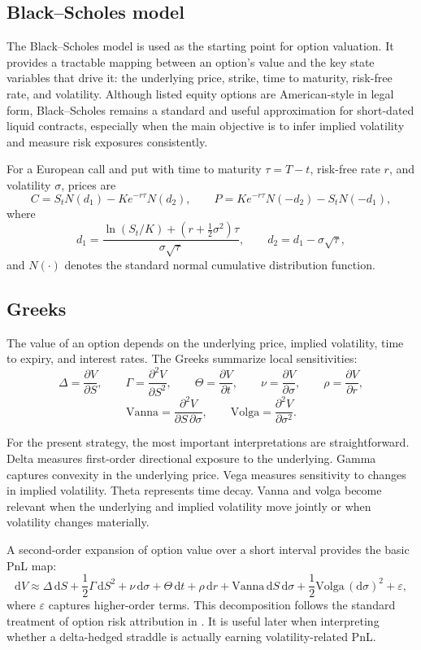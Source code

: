 ﻿\documentclass{article}
\begin{document}
\subsection{Black--Scholes model}

The Black--Scholes model is used as the starting point for option valuation. It provides a tractable mapping between an option's value and the key state variables that drive it: the underlying price, strike, time to maturity, risk-free rate, and volatility. Although listed equity options are American-style in legal form, Black--Scholes remains a standard and useful approximation for short-dated liquid contracts, especially when the main objective is to infer implied volatility and measure risk exposures consistently.

For a European call and put with time to maturity $\tau=T-t$, risk-free rate $r$, and volatility $\sigma$, prices are
\[
C=S_t N(d_1)-Ke^{-r\tau}N(d_2), \qquad
P=Ke^{-r\tau}N(-d_2)-S_tN(-d_1),
\]
where
\[
d_1=\frac{\ln(S_t/K)+(r+\tfrac{1}{2}\sigma^2)\tau}{\sigma\sqrt{\tau}},
\qquad
d_2=d_1-\sigma\sqrt{\tau},
\]
and $N(\cdot)$ denotes the standard normal cumulative distribution function.

\subsection{Greeks}

The value of an option depends on the underlying price, implied volatility, time to expiry, and interest rates. The Greeks summarize local sensitivities:
\[
\Delta=\frac{\partial V}{\partial S}, \qquad
\Gamma=\frac{\partial^2 V}{\partial S^2}, \qquad
\Theta=\frac{\partial V}{\partial t}, \qquad
\nu=\frac{\partial V}{\partial \sigma}, \qquad
\rho=\frac{\partial V}{\partial r},
\]
\[
\text{Vanna}=\frac{\partial^2 V}{\partial S\,\partial \sigma},
\qquad
\text{Volga}=\frac{\partial^2 V}{\partial \sigma^2}.
\]

For the present strategy, the most important interpretations are straightforward. Delta measures first-order directional exposure to the underlying. Gamma captures convexity in the underlying price. Vega measures sensitivity to changes in implied volatility. Theta represents time decay. Vanna and volga become relevant when the underlying and implied volatility move jointly or when volatility changes materially.

A second-order expansion of option value over a short interval provides the basic PnL map:
\[
\mathrm{d}V \approx
\Delta\,\mathrm{d}S
+\frac{1}{2}\Gamma\,\mathrm{d}S^2
+\nu\,\mathrm{d}\sigma
+\Theta\,\mathrm{d}t
+\rho\,\mathrm{d}r
+\text{Vanna}\,\mathrm{d}S\,\mathrm{d}\sigma
+\frac{1}{2}\text{Volga}\,(\mathrm{d}\sigma)^2
+\varepsilon,
\]
where $\varepsilon$ captures higher-order terms. This decomposition follows the standard treatment of option risk attribution in \cite{bossu2014}. It is useful later when interpreting whether a delta-hedged straddle is actually earning volatility-related PnL.
\end{document}
